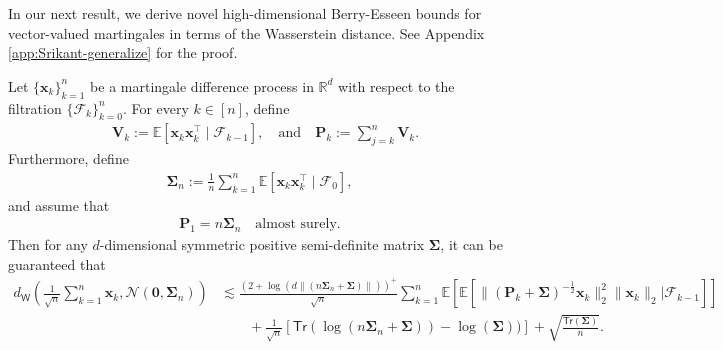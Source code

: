In our next result, we derive novel high-dimensional Berry-Esseen bounds for vector-valued martingales in terms of the  Wasserstein distance. See Appendix \ref{app:Srikant-generalize} for the proof.

\medskip
\begin{customtheorem}\label{thm:Srikant-generalize}
Let $\{\bm{x}_k\}_{k=1}^n$ be a martingale difference process in $\mathbb{R}^d$ with respect to the filtration $\{\mathscr{F}_k\}_{k=0}^n$.
For every $k \in [n]$, define 
\begin{align*}
&\bm{V}_k := \mathbb{E}[\bm{x}_k\bm{x}_k^\top \mid \mathscr{F}_{k-1}], \quad  \text{and}  \quad \bm{P}_k := \sum_{j=k}^n \bm{V}_k.
\end{align*}
Furthermore, define
\begin{align*}
\bm{\Sigma}_n := \frac{1}{n}\sum_{k=1}^n \mathbb{E}[\bm{x}_k \bm{x}_k^\top \mid \mathscr{F}_0], 
\end{align*}
and assume that
\begin{align}\label{eq:as-P1}
\bm{P}_1 = n\bm{\Sigma}_n \quad \text{almost surely.}
\end{align}
Then for any  $d$-dimensional symmetric positive semi-definite matrix $\bm{\Sigma}$, it can be guaranteed that
\begin{align}\label{eq:Srikant-Berry-Esseen}
d_{\mathsf{W}}\left(\frac{1}{\sqrt{n}}\sum_{k=1}^n \bm{x}_k,\mathcal{N}(\bm{0},\bm{\Sigma}_n)\right) &\lesssim  \frac{(2+\log(d\|(n\bm{\Sigma}_n + \bm{\Sigma})\|))^+}{\sqrt{n}} \sum_{k=1}^n \mathbb{E}\left[\mathbb{E}\left[\|(\bm{P}_k + \bm{\Sigma})^{-\frac{1}{2}}\bm{x}_k\|_2^2 \|\bm{x}_k\|_2 \bigg|\mathscr{F}_{k-1}\right]\right] \nonumber \\ 
&\qquad+ \frac{1}{\sqrt{n}}\left[\mathsf{Tr}(\log(n\bm{\Sigma}_n+\bm{\Sigma})) - \log(\bm{\Sigma}))\right]+ \sqrt{\frac{\mathsf{Tr}(\bm{\Sigma})}{n}}.
\end{align}
\end{customtheorem}
\medskip


